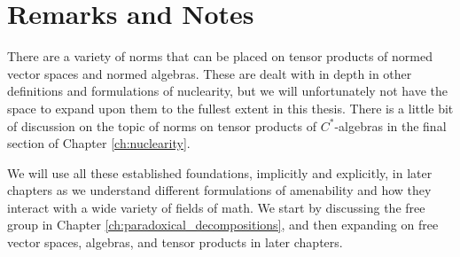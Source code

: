 \section{Remarks and Notes}%
There are a variety of norms that can be placed on tensor products of normed vector spaces and normed algebras. These are dealt with in depth in other definitions and formulations of nuclearity, but we will unfortunately not have the space to expand upon them to the fullest extent in this thesis. There is a little bit of discussion on the topic of norms on tensor products of $C^{\ast}$-algebras in the final section of Chapter \ref{ch:nuclearity}.\newline

We will use all these established foundations, implicitly and explicitly, in later chapters as we understand different formulations of amenability and how they interact with a wide variety of fields of math. We start by discussing the free group in Chapter \ref{ch:paradoxical_decompositions}, and then expanding on free vector spaces, algebras, and tensor products in later chapters.
